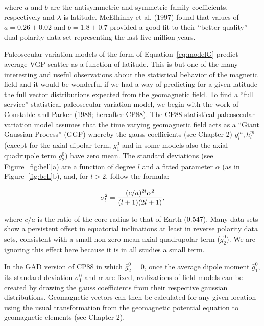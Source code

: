 \noindent where $a$ and $b$ are the antisymmetric and symmetric family coefficients,  respectively and $\lambda$ is latitude.  \nocite{mcfadden88} 
McElhinny et al. (1997) found that values of $a=0.26\pm0.02$ and $b=1.8\pm 0.7$ provided a good fit to their ``better quality'' dual polarity data set representing the last five million years.  \nocite{mcelhinny97}

Paleosecular variation models of the form of Equation~\ref{eq:modelG} predict average VGP scatter as a function of latitude. 
This is but one of the many interesting and useful observations about the statistical behavior of the magnetic field and  it would be wonderful  if we had a way of predicting for a given latitude the full vector distributions expected from the geomagnetic field.    To find a ``full service''  statistical paleosecular variation model, we begin with  the work of 
Constable and Parker (1988;  hereafter CP88).   \nocite{constable88}
  The CP88 statistical paleosecular variation model assumes that the time varying geomagnetic field acts as a ``Giant Gaussian Process'' (GGP) whereby the gauss coefficients (see Chapter 2)   $g_l^m, h_l^m$  (except for the axial dipolar term, $g_1^0$ and in some models also the axial quadrupole term $g_2^0$) have zero mean.  The standard deviations (see Figure~\ref{fig:bell}a)  are a function of degree $l$ and   a fitted parameter $\alpha$ (as in Figure~\ref{fig:bell}b), and, for $l>2$,  follow the formula:
  
  \begin{equation}
{\sigma_l^2 } = { { (c/a)^{2l} \alpha^2}\over {(l+1)(2l+1)} },
\label{eq:sigma1}
\end{equation}

\noindent where $c/a$ is the ratio of the core radius to that of  Earth (0.547).   Many data sets show a persistent offset in equatorial inclinations  at least in reverse polarity data sets, consistent with a small non-zero mean axial quadrupolar term ($\bar g_2^0$).   We are ignoring this effect here because it is in all studies a small term.    
 



In the GAD version of CP88 in which $\bar{g}_2^0=0$, once  the average dipole moment $\bar g_1^0$, its standard deviation $\sigma_1^0$ and $\alpha$ are fixed,  realizations of field models can be created by drawing the gauss coefficients from their respective gaussian distributions.  Geomagnetic vectors can then be calculated for any given location using the usual transformation from the geomagnetic potential equation to geomagnetic elements (see Chapter 2).  


